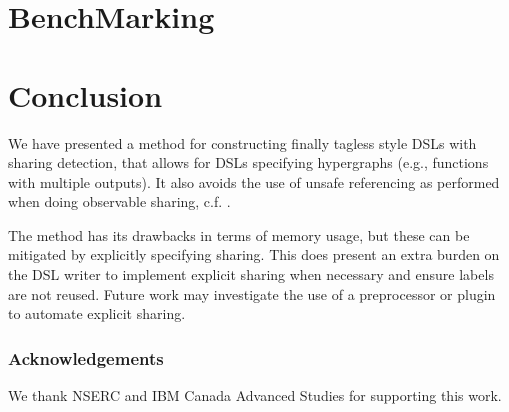 \documentclass[runningheads]{llncs}
\begin{document}
\section{BenchMarking}

\section{Conclusion}
We have presented a method for constructing finally tagless style DSLs with
sharing detection, that allows for DSLs specifying hypergraphs (e.g., functions with multiple outputs).
It also avoids the use of unsafe referencing as performed when doing observable sharing, c.f. \cite{gill:observablesharing}.

The method has its drawbacks in terms of memory usage, but these can be mitigated
by explicitly specifying sharing. This does present an extra burden on the DSL
writer to implement explicit sharing when necessary and ensure labels are not
reused. Future work may investigate the use of a preprocessor or plugin to
automate explicit sharing.

\subsubsection{Acknowledgements} We thank NSERC and IBM Canada Advanced Studies for supporting this work.
%
%


\end{document}

